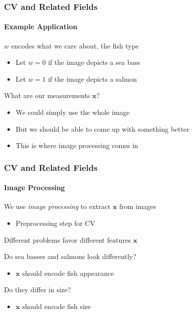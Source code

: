 \documentclass[xetex,professionalfont]{beamer}
\renewcommand{\vec}[1]{\ensuremath{\mathbf{#1}}}
\newcommand{\vx}{\vec{x}}
\begin{document}

\begin{frame}
\frametitle{CV and Related Fields}
\framesubtitle{Example Application}

$w$ encodes what we care about, the fish type
\begin{itemize}
    \item Let $w=0$ if the image depicts a sea bass
    \item Let $w=1$ if the image depicts a salmon
\end{itemize}

\bigskip
What are our measurements $\vx$?
\begin{itemize}
    \item We could simply use the whole image
    \item But we should be able to come up with something better
    \item This is where image processing comes in
\end{itemize}

\end{frame}


\begin{frame}
\frametitle{CV and Related Fields}
\framesubtitle{Image Processing}

We use \emph{image processing} to extract $\vx$ from images
\begin{itemize}
    \item Preprocessing step for CV
\end{itemize}

\bigskip
Different problems favor different features $\vx$

\bigskip
Do sea basses and salmons look differently?
\begin{itemize}
    \item $\vx$ should encode fish appearance
\end{itemize}

\bigskip
Do they differ in size?
\begin{itemize}
    \item $\vx$ should encode fish size
\end{itemize}

\end{frame}

\end{document}
